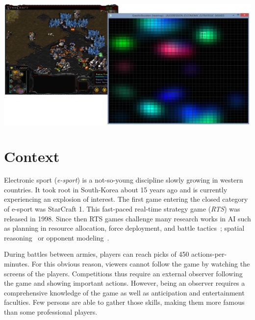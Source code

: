 \documentclass{jfsma}
\begin{document}
	\maketitle

	\begin{strip}
  \centering\noindent
  \includegraphics[scale=0.35]{gfx/GB}
  \vspace{0.3cm}
\end{strip}

	\section{Context}
    Electronic sport (\textit{e-sport}) is a not-so-young discipline slowly growing in western countries.
    It took root in South-Korea about 15 years ago and is currently experiencing an explosion of interest.
    The first game entering the closed category of e-sport was StarCraft 1. %
    This fast-paced real-time strategy game (\textit{RTS}) was released in 1998.
    Since then RTS games challenge many research works in AI such as planning in resource allocation, force deployment, and battle tactics~\cite{weber2009case,mccoy2008integrated}; spatial reasoning~\cite{forbus2002qualitative} or opponent modeling~\cite{schadd2007opponent}.

    During battles between armies, players can reach picks of 450 actions-per-minutes.
    For this obvious reason, viewers cannot follow the game by watching the screens of the players.
    Competitions thus require an external observer following the game and showing important actions.
    However, being an observer requires a comprehensive knowledge of the game as well as anticipation and entertainment faculties.
    Few persons are able to gather those skills, making them more famous than some professional players.
\end{document}
